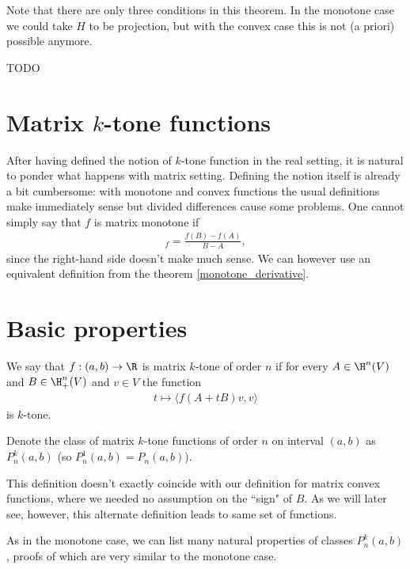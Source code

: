 Note that there are only three conditions in this theorem. In the monotone case we could take $H$ to be projection, but with the convex case this is not (a priori) possible anymore.

TODO

\section{Matrix $k$-tone functions}

After having defined the notion of $k$-tone function in the real setting, it is natural to ponder what happens with matrix setting. Defining the notion itself is already a bit cumbersome: with monotone and convex functions the usual definitions make immediately sense but divided differences cause some problems. One cannot simply say that $f$ is matrix monotone if
\begin{align*}
	[A, B]_{f} = \frac{f(B) - f(A)}{B - A},
\end{align*}
since the right-hand side doesn't make much sense. We can however use an equivalent definition from the theorem \ref{monotone_derivative}.

\section{Basic properties}

\begin{maar}
	We say that $f : (a, b) \to \R$ is matrix $k$-tone of order $n$ if for every $A \in \H^{n}(V)$ and $B \in \H^{n}_{+}(V)$ and $v \in V$ the function
	\begin{align*}
		t \mapsto \langle f(A + t B) v, v \rangle
	\end{align*}
	is $k$-tone.
\end{maar}

Denote the class of matrix $k$-tone functions of order $n$ on interval $(a, b)$ as $P^{k}_{n}(a, b)$ (so $P^{1}_{n}(a, b) = P_{n}(a, b)$).

This definition doesn't exactly coincide with our definition for matrix convex functions, where we needed no assumption on the ``sign" of $B$. As we will later see, however, this alternate definition leads to same set of functions.


As in the monotone case, we can list many natural properties of classes $P^{k}_{n}(a, b)$, proofs of which are very similar to the monotone case.

